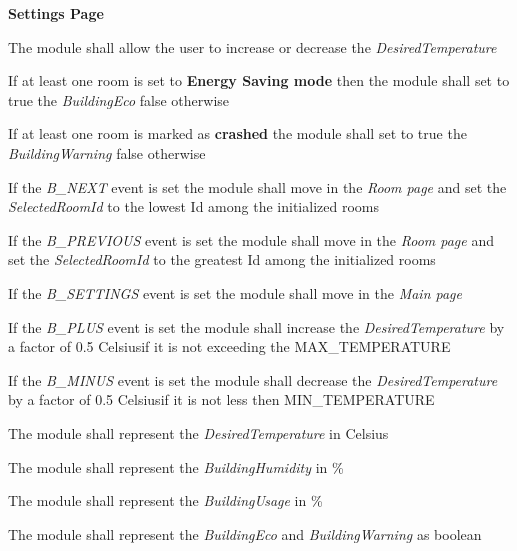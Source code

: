 \begin{req_enum}
\begin{req_enum}[label*=\arabic*.]
					\item \textbf{Settings Page}
						\begin{req_enum}[label*=\arabic*.]
							\item The module shall allow the user to increase or decrease the \textit{DesiredTemperature} \\

							\item If at least one room is set to \textbf{Energy Saving mode} then the module shall set to true the \textit{BuildingEco} false otherwise \\
							\item If at least one room is marked as \textbf{crashed} the module shall set to true the \textit{BuildingWarning} false otherwise \\

							\item If the \textit{B\_NEXT} event is set the module shall move in the \textit{Room page} and set the \textit{SelectedRoomId} to the lowest Id among the initialized rooms \\
							\item If the \textit{B\_PREVIOUS} event is set the module shall move in the \textit{Room page} and set the \textit{SelectedRoomId} to the greatest Id among the initialized rooms \\
							\item If the \textit{B\_SETTINGS} event is set the module shall move in the \textit{Main page}
							\item If the \textit{B\_PLUS} event is set the module shall increase the \textit{DesiredTemperature} by a factor of 0.5 Celsius\degree  if it is not exceeding the MAX\_TEMPERATURE
							\item If the \textit{B\_MINUS} event is set the module shall decrease the \textit{DesiredTemperature} by a factor of 0.5 Celsius\degree  if it is not less then MIN\_TEMPERATURE

							\item The module shall represent the \textit{DesiredTemperature} in Celsius\degree \\
							\item The module shall represent the \textit{BuildingHumidity} in \% \\
							\item The module shall represent the \textit{BuildingUsage} in \% \\
							\item The module shall represent the \textit{BuildingEco} and \textit{BuildingWarning} as boolean \\
						\end{req_enum}


\end{req_enum}
\end{req_enum}

